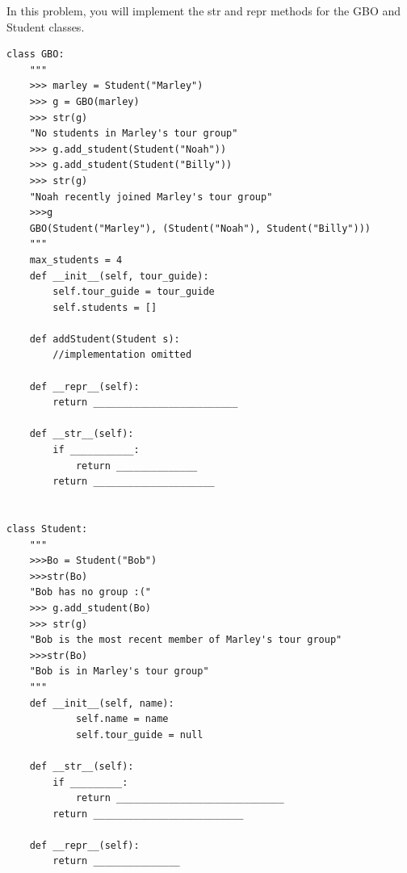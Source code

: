 \begin{blocksection}
\question
In this problem, you will implement the str and repr methods for the GBO and Student classes.

\begin{lstlisting}[breaklines=true]
class GBO:
    """
    >>> marley = Student("Marley")
    >>> g = GBO(marley)
    >>> str(g)
    "No students in Marley's tour group"
    >>> g.add_student(Student("Noah"))
    >>> g.add_student(Student("Billy"))
    >>> str(g)
    "Noah recently joined Marley's tour group"
    >>>g
    GBO(Student("Marley"), (Student("Noah"), Student("Billy")))
    """
    max_students = 4
    def __init__(self, tour_guide):
        self.tour_guide = tour_guide
        self.students = []
            
    def addStudent(Student s):
        //implementation omitted
    
    def __repr__(self):
        return _________________________
    
    def __str__(self): 
        if ___________:
            return ______________
        return _____________________
    
    
class Student:
    """
    >>>Bo = Student("Bob")
    >>>str(Bo)
    "Bob has no group :("
    >>> g.add_student(Bo)
    >>> str(g)
    "Bob is the most recent member of Marley's tour group"
    >>>str(Bo)
    "Bob is in Marley's tour group"
    """
    def __init__(self, name):
            self.name = name
            self.tour_guide = null
    
    def __str__(self):
        if _________:
            return _____________________________
        return __________________________
    
    def __repr__(self):
        return _______________
    
\end{lstlisting}
\end{blocksection}

